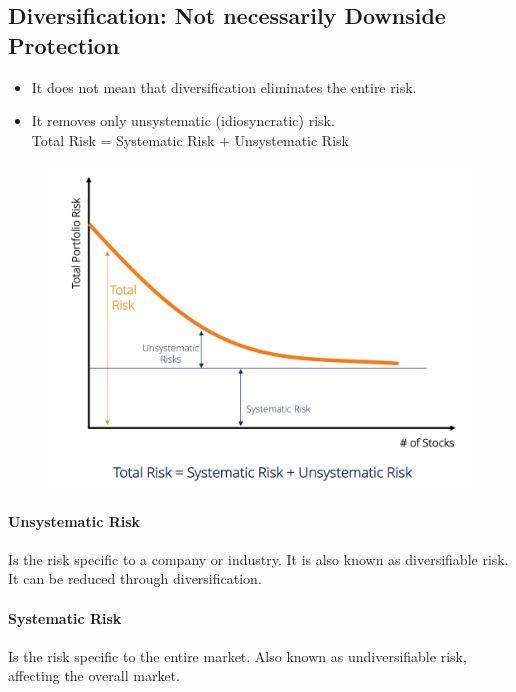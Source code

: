 \documentclass[11pt,a4paper]{report}
\begin{document}
\subsection{Diversification: Not necessarily Downside Protection}
\begin{itemize}
    \item It does not mean that diversification eliminates the entire risk.
    \item It removes only unsystematic (idiosyncratic) risk.
    \\ Total Risk = Systematic Risk + Unsystematic Risk
\end{itemize}
\begin{figure}[h]
    \centering
    \includegraphics[width=\textwidth]{images/totalrisk.png}
\end{figure}

\paragraph{Unsystematic Risk} Is the risk specific to a company or industry. It is also known as diversifiable risk. It can be reduced through diversification.
\paragraph{Systematic Risk} Is the risk specific to the entire market. Also known as undiversifiable risk, affecting the overall market.
\end{document}

